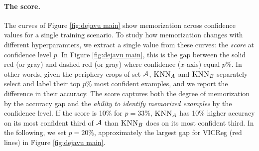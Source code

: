 \paragraph{The \dejavu score. }
The curves of Figure \ref{fig:dejavu main} show memorization across confidence values for a single training scenario.  To study how memorization changes with different hyperparamters, we extract a single value from these curves: the \dejavu \emph{score} at confidence level $p$. In Figure \ref{fig:dejavu main}, this is the gap between the solid red (or gray) and dashed red (or gray) where confidence ($x$-axis) equal $p\%$. In other words, given the periphery crops of set $\mathcal{A}$, $\textsc{KNN}_A$ and $\textsc{KNN}_B$ separately select and label their top $p\%$ most confident examples, and we report the difference in their accuracy. The \dejavu score captures both the degree of memorization by the accuracy gap and the \emph{ability to identify memorized examples} by the confidence level. If the score is 10\% for $p=33\%$, $\textsc{KNN}_A$ has 10\% higher accuracy on its most confident third of $\mathcal{A}$ than $\textsc{KNN}_B$ does on its most confident third. In the following, we set $p = 20\%$, approximately the largest gap for VICReg (red lines) in Figure \ref{fig:dejavu main}. 

